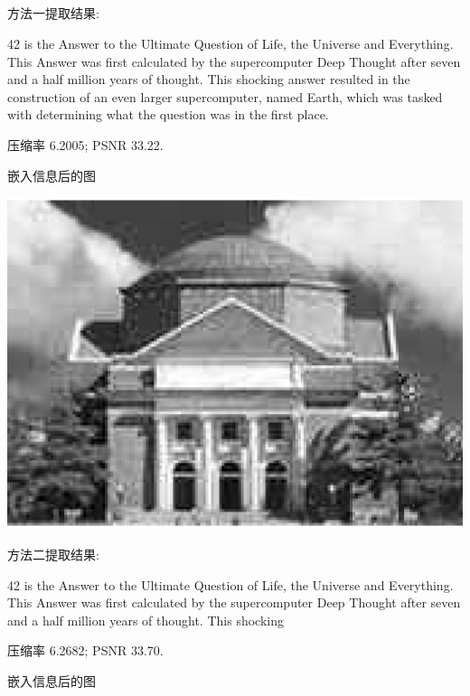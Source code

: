 \documentclass{article}
\begin{document}
\subsection{}
\noindent{}
\par 方法一提取结果:
\par 	42 is the Answer to the Ultimate Question of Life, the Universe and Everything. This Answer was first calculated by the supercomputer Deep Thought after seven and a half million years of thought. This shocking answer resulted in the construction of an even larger supercomputer, named Earth, which was tasked with determining what the question was in the first place.
\par 压缩率 6.2005; PSNR 33.22.
\par 嵌入信息后的图
\begin{center}\includegraphics[width=\textwidth]{hidden1.eps}\end{center}
\par 方法二提取结果:
\par 	42 is the Answer to the Ultimate Question of Life, the Universe and Everything. This Answer was first calculated by the supercomputer Deep Thought after seven and a half million years of thought. This shocking
\par 压缩率 6.2682; PSNR 33.70.
\par 嵌入信息后的图
\end{document}
